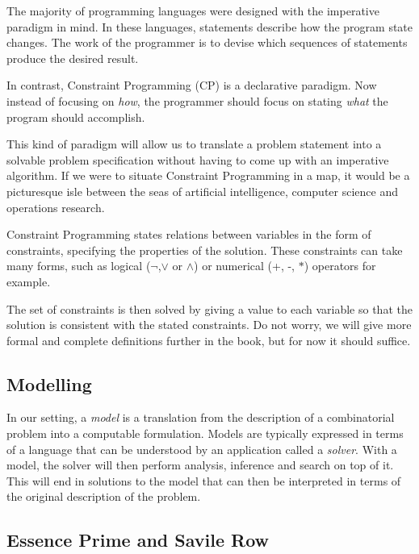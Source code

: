 The majority of programming languages were designed with the imperative
paradigm in mind. In these languages, statements describe how the program state
changes.  The work of the programmer is to devise which sequences of statements
produce the desired result.

In contrast, Constraint Programming (CP) is a declarative paradigm. Now instead
of focusing on \emph{how}, the programmer should focus on stating \emph{what}
the program should accomplish.


This kind of paradigm will allow us to translate a problem statement into a
solvable problem specification without having to come up with an imperative
algorithm.  If we were to situate Constraint Programming in a map, it would be
a picturesque isle between the seas of artificial intelligence, computer
science and operations research.

Constraint Programming states relations between variables in the form of
constraints, specifying the properties of the solution. These constraints can
take many forms, such as logical ($\neg$,$\vee$ or $\wedge$) or numerical (+,
-, $*$) operators for example.

The set of constraints is then solved by giving a value to each variable so
that the solution is consistent with the stated constraints.  Do not worry, we
will give more formal and complete definitions further in the book, but for now
it should suffice.

\subsection{Modelling}

In our setting, a \emph{model} is a translation from the description of a
combinatorial problem into a computable formulation. Models are typically
expressed in terms of a language that can be understood by an application
called a \emph{solver}. With a model, the solver will then perform analysis, 
inference and search on top of it. This will end in solutions to the model that
can then be interpreted in terms of the original description of the problem. 


\subsection{Essence Prime and Savile Row}

